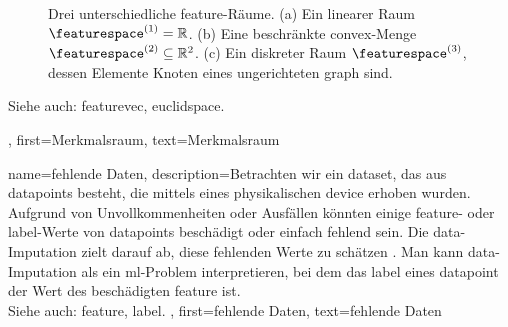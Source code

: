 {{{{{{\begin{figure}[H]
		\caption{Drei unterschiedliche \gls{feature}-Räume. (a) Ein linearer Raum $\featurespace^{(1)} = \mathbb{R}$. (b) Eine 
		beschränkte \gls{convex}-Menge $\featurespace^{(2)} \subseteq \mathbb{R}^{2}$. (c) Ein diskreter Raum 
		$\featurespace^{(3)}$, dessen Elemente Knoten eines ungerichteten \gls{graph} sind. \label{fig_featurespace_dict}}
		\end{figure}
		Siehe auch: \gls{featurevec}, \gls{euclidspace}.},
	first={Merkmalsraum},
	text={Merkmalsraum}  
}


{name={fehlende Daten},
	description={Betrachten wir ein \gls{dataset}, das aus \glspl{datapoint} besteht, die 
		mittels eines physikalischen \gls{device} erhoben wurden. Aufgrund von Unvollkommenheiten oder Ausfällen 
		könnten einige \gls{feature}- oder \gls{label}-Werte von \glspl{datapoint} beschädigt oder einfach 
		fehlend sein. Die \gls{data}-Imputation zielt darauf ab, diese fehlenden Werte zu schätzen \cite{Abayomi2008DiagnosticsFM}. 
		Man kann \gls{data}-Imputation als ein \gls{ml}-Problem interpretieren, bei dem das \gls{label} eines \gls{datapoint} 
		der Wert des beschädigten \gls{feature} ist.
		\\
		Siehe auch: \gls{feature}, \gls{label}. },
	first={fehlende Daten},
	text={fehlende Daten}  
}


}}}}
